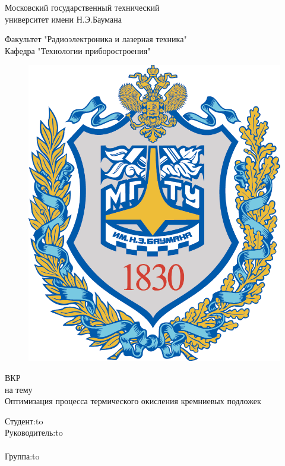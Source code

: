 \begin{titlepage}
\newpage

\begin{center}
\LARGE Московский государственный технический \\
\LARGE университет имени Н.Э.Баумана \\
\end{center}


\begin{center}
\large Факультет "Радиоэлектроника и лазерная техника" \\
\large Кафедра "Технологии приборостроения"
\end{center}

\begin{figure}[h]
	\centering
	\includegraphics[width = 0.4\linewidth]{logo-bmstu-big.png}
	 
\end{figure}

\vspace{2em}
\begin{center}
	\LARGE ВКР \\
	\LARGE на тему\\
	\vspace{2em}
	\Huge  Оптимизация процесса термического окисления кремниевых подложек \\
\end{center}









\vspace{3em}



\newbox{\lbox}
\newlength{\maxl}
\setlength{\maxl}{\wd\lbox}
\hfill\parbox{11cm}{
\hspace*{5cm}\hspace*{-5cm}\large Студент:\hfill\hbox to\\
\hspace*{5cm}\hspace*{-5cm}\large Руководитель:\hfill\hbox to\\
\\
\hspace*{5cm}\hspace*{-5cm}Группа:\hfill\hbox to\\
}



\end{titlepage}
